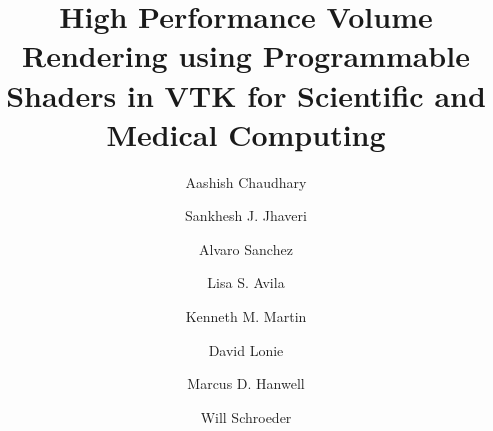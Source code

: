 \title{High Performance Volume Rendering using Programmable Shaders in VTK for Scientific and Medical Computing}

\author{Aashish Chaudhary}

\author{Sankhesh J. Jhaveri}

\author{Alvaro Sanchez\corref{}}

\author{Lisa S. Avila}

\author{Kenneth M. Martin}

\author{David Lonie}

\author{Marcus D. Hanwell}

\author{Will Schroeder}

\address{Kitware, Inc., 28 Corporate Drive, Clifton Park, NY 12065, USA}
